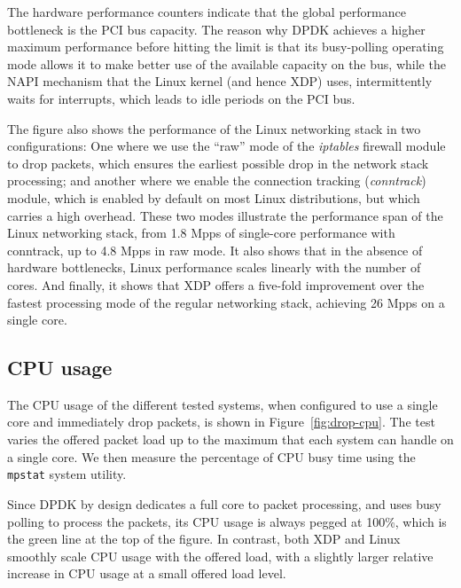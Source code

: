 \documentclass[10pt,sigconf]{acmart}
\begin{document}
The hardware performance counters indicate that the global performance
bottleneck is the PCI bus capacity. The reason why DPDK achieves a higher
maximum performance before hitting the limit is that its busy-polling operating
mode allows it to make better use of the available capacity on the bus, while
the NAPI mechanism that the Linux kernel (and hence XDP) uses, intermittently
waits for interrupts, which leads to idle periods on the PCI bus.

The figure also shows the performance of the Linux networking stack in two
configurations: One where we use the ``raw'' mode of the \emph{iptables}
firewall module to drop packets, which ensures the earliest possible drop in the
network stack processing; and another where we enable the connection tracking
(\emph{conntrack}) module, which is enabled by default on most Linux
distributions, but which carries a high overhead. These two modes illustrate the
performance span of the Linux networking stack, from 1.8 Mpps of single-core
performance with conntrack, up to 4.8 Mpps in raw mode. It also shows that in
the absence of hardware bottlenecks, Linux performance scales linearly with the
number of cores. And finally, it shows that XDP offers a five-fold improvement
over the fastest processing mode of the regular networking stack, achieving 26
Mpps on a single core.


\subsection{CPU usage}
\label{sec:cpu-usage}

The CPU usage of the different tested systems, when configured to use a single
core and immediately drop packets, is shown in Figure~\ref{fig:drop-cpu}. The
test varies the offered packet load up to the maximum that each system can
handle on a single core. We then measure the percentage of CPU busy time using
the \texttt{mpstat} system utility.

Since DPDK by design dedicates a full core to packet processing, and uses busy
polling to process the packets, its CPU usage is always pegged at 100\%, which
is the green line at the top of the figure. In contrast, both XDP and Linux
smoothly scale CPU usage with the offered load, with a slightly larger relative
increase in CPU usage at a small offered load level.
\end{document}

